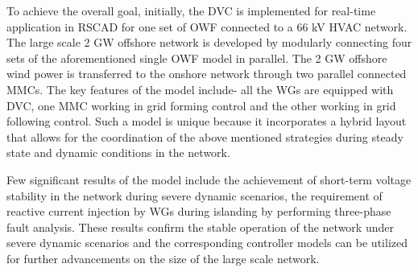 To achieve the overall goal, initially, the \gls{DVC} is implemented for real-time application in RSCAD for one set of \gls{OWF} connected to a 66 kV \gls{HVAC} network. The large scale 2 GW offshore network is developed by modularly connecting four sets of the aforementioned single \gls{OWF} model in parallel. The 2 GW offshore wind power is transferred to the onshore network through two parallel connected \gls{MMC}s. The key features of the model include- all the \gls{WG}s are equipped with \gls{DVC}, one \gls{MMC} working in grid forming control and the other working in grid following control. Such a model is unique because it incorporates a hybrid layout that allows for the coordination of the above mentioned strategies during steady state and dynamic conditions in the network.    


Few significant results of the model include the achievement of short-term voltage stability in the network during severe dynamic scenarios, the requirement of reactive current injection by \gls{WG}s during islanding by performing three-phase fault analysis. These results confirm the stable operation of the network under severe dynamic scenarios and the corresponding controller models can be utilized for further advancements on the size of the large scale network.  





